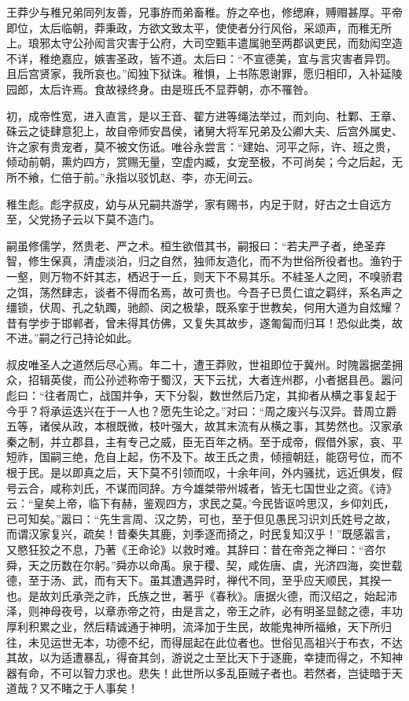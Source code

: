\documentclass[12pt,UTF8]{ctexbook}
\begin{document}
王莽少与稚兄弟同列友善，兄事斿而弟畜稚。斿之卒也，修缌麻，赙赗甚厚。平帝即位，太后临朝，莽秉政，方欲文致太平，使使者分行风俗，采颂声，而稚无所上。琅邪太守公孙闳言灾害于公府，大司空甄丰遣属驰至两郡讽吏民，而劾闳空造不详，稚绝嘉应，嫉害圣政，皆不道。太后曰：“不宣德美，宜与言灾害者异罚。且后宫贤家，我所哀也。”闳独下狱诛。稚惧，上书陈恩谢罪，愿归相印，入补延陵园郎，太后许焉。食故禄终身。由是班氏不显莽朝，亦不罹咎。



初，成帝性宽，进入直言，是以王音、翟方进等绳法举过，而刘向、杜鄴、王章、硃云之徒肆意犯上，故自帝师安昌侯，诸舅大将军兄弟及公卿大夫、后宫外属史、许之家有贵宠者，莫不被文伤诋。唯谷永尝言：“建始、河平之际，许、班之贵，倾动前朝，熏灼四方，赏赐无量，空虚内臧，女宠至极，不可尚矣；今之后起，无所不飨，仁倍于前。”永指以驳饥赵、李，亦无间云。



稚生彪。彪字叔皮，幼与从兄嗣共游学，家有赐书，内足于财，好古之士自远方至，父党扬子云以下莫不造门。



嗣虽修儒学，然贵老、严之术。桓生欲借其书，嗣报曰：“若夫严子者，绝圣弃智，修生保真，清虚淡泊，归之自然，独师友造化，而不为世俗所役者也。渔钓于一壑，则万物不奸其志，栖迟于一丘，则天下不易其乐。不絓圣人之罔，不嗅骄君之饵，荡然肆志，谈者不得而名焉，故可贵也。今吾子已贯仁谊之羁绊，系名声之缰锁，伏周、孔之轨躅，驰颜、闵之极挚，既系挛于世教矣，何用大道为自炫耀？昔有学步于邯郸者，曾未得其仿佛，又复失其故步，遂匍匐而归耳！恐似此类，故不进。”嗣之行己持论如此。



叔皮唯圣人之道然后尽心焉。年二十，遭王莽败，世祖即位于冀州。时隗嚣据垄拥众，招辑英俊，而公孙述称帝于蜀汉，天下云扰，大者连州郡，小者据县邑。嚣问彪曰：“往者周亡，战国并争，天下分裂，数世然后乃定，其抑者从横之事复起于今乎？将承运迭兴在于一人也？愿先生论之。”对曰：“周之废兴与汉异。昔周立爵五等，诸侯从政，本根既微，枝叶强大，故其末流有从横之事，其势然也。汉家承秦之制，并立郡县，主有专己之威，臣无百年之柄。至于成帝，假借外家，哀、平短祚，国嗣三绝，危自上起，伤不及下。故王氏之贵，倾擅朝廷，能窃号位，而不根于民。是以即真之后，天下莫不引领而叹，十余年间，外内骚扰，远近俱发，假号云合，咸称刘氏，不谋而同辞。方今雄桀带州城者，皆无七国世业之资。《诗》云：“皇矣上帝，临下有赫，鉴观四方，求民之莫。’今民皆讴吟思汉，乡仰刘氏，已可知矣。”嚣曰：“先生言周、汉之势，可也，至于但见愚民习识刘氏姓号之故，而谓汉家复兴，疏矣！昔秦失其鹿，刘季逐而掎之，时民复知汉乎！”既感嚣言，又愍狂狡之不息，乃著《王命论》以救时难。其辞曰：昔在帝尧之禅曰：“咨尔舜，天之历数在尔躬。”舜亦以命禹。泉于稷、契，咸佐唐、虞，光济四海，奕世载德，至于汤、武，而有天下。虽其遭遇异时，禅代不同，至乎应天顺民，其揆一也。是故刘氏承尧之祚，氏族之世，著乎《春秋》。唐据火德，而汉绍之，始起沛泽，则神母夜号，以章赤帝之符，由是言之，帝王之祚，必有明圣显懿之德，丰功厚利积累之业，然后精诚通于神明，流泽加于生民，故能鬼神所福飨，天下所归往，未见运世无本，功德不纪，而得屈起在此位者也。世俗见高祖兴于布衣，不达其故，以为适遭暴乱，得奋其剑，游说之士至比天下于逐鹿，幸捷而得之，不知神器有命，不可以智力求也。悲失！此世所以多乱臣贼子者也。若然者，岂徒暗于天道哉？又不睹之于人事矣！
\end{document}
